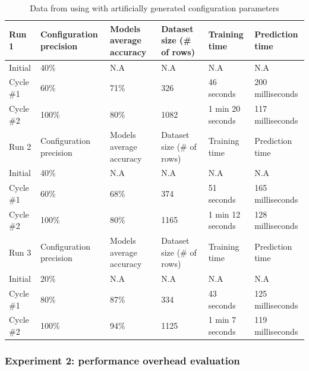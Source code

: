 \begin{table}[t]
\caption{Data from using \projectname{} with artificially generated configuration parameters}
\label{tab:experiment1}
\begin{tabular}{llllll}
\hline
Run 1     & Configuration precision & Models average accuracy & Dataset size (\# of rows) & Training time    & Prediction time  \\ \hline
Initial   & 40\%                    & N.A                     & N.A                       & N.A              & N.A              \\
Cycle \#1 & 60\%                    & 71\%                    & 326                       & 46 seconds       & 200 milliseconds \\
Cycle \#2 & 100\%                   & 80\%                    & 1082                      & 1 min 20 seconds & 117 milliseconds \\ \hline
Run 2     & Configuration precision & Models average accuracy & Dataset size (\# of rows) & Training time    & Prediction time  \\ \hline
Initial   & 40\%                    & N.A                     & N.A                       & N.A              & N.A              \\
Cycle \#1 & 60\%                    & 68\%                    & 374                       & 51 seconds       & 165 milliseconds \\
Cycle \#2 & 100\%                   & 80\%                    & 1165                      & 1 min 12 seconds & 128 milliseconds \\ \hline
Run 3     & Configuration precision & Models average accuracy & Dataset size (\# of rows) & Training time    & Prediction time  \\ \hline
Initial   & 20\%                    & N.A                     & N.A                       & N.A              & N.A              \\
Cycle \#1 & 80\%                    & 87\%                    & 334                       & 43 seconds       & 125 milliseconds \\
Cycle \#2 & 100\%                   & 94\%                    & 1125                      & 1 min 7 seconds  & 119 milliseconds
\end{tabular}
\end{table}


\subsubsection{Experiment 2: performance overhead evaluation}

